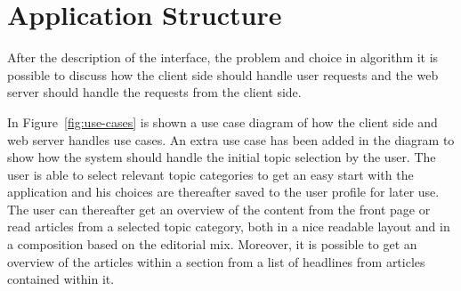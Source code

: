 \section{Application Structure}
After the description of the interface, the problem and choice in algorithm it is possible to discuss how the client side should handle user requests and the web server should handle the requests from the client side.
\begin{figure}[h!tp]
	\myfloatalign
\end{figure}
In Figure~\ref{fig:use-cases} is shown a use case diagram of how the client side and web server handles use cases. An extra use case has been added in the diagram to show how the system should handle the initial topic selection by the user. The user is able to select relevant topic categories to get an easy start with the application and his choices are thereafter saved to the user profile for later use. The user can thereafter get an overview of the content from the front page or read articles from a selected topic category, both in a nice readable layout and in a composition based on the editorial mix. Moreover, it is possible to get an overview of the articles within a section from a list of headlines from articles contained within it.

